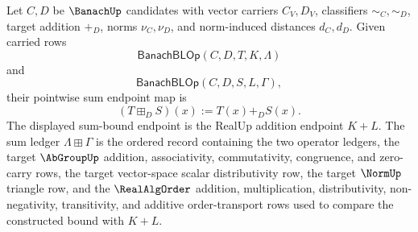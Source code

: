 \begin{definition}
\label{def:banach-bounded-linear-operator-pointwise-sum-carrier}
Let $C,D$ be $\BanachUp$ candidates with vector carriers $C_V,D_V$,
classifiers $\sim_C,\sim_D$, target addition $+_D$, norms $\nu_C,\nu_D$,
and norm-induced distances $d_C,d_D$. Given carried rows
$$
\mathsf{BanachBLOp}(C,D,T,K,\Lambda)
$$
and
$$
\mathsf{BanachBLOp}(C,D,S,L,\Gamma),
$$
their pointwise sum endpoint map is
$$
(T\boxplus_D S)(x):=T(x)+_D S(x).
$$
The displayed sum-bound endpoint is the RealUp addition endpoint $K+L$. The
sum ledger $\Lambda\boxplus\Gamma$ is the ordered record containing the two
operator ledgers, the target $\AbGroupUp$ addition, associativity,
commutativity, congruence, and zero-carry rows, the target vector-space scalar
distributivity row, the target $\NormUp$ triangle row, and the $\RealAlgOrder$
addition, multiplication, distributivity, non-negativity, transitivity, and
additive order-transport rows used to compare the constructed bound with
$K+L$.
\end{definition}

